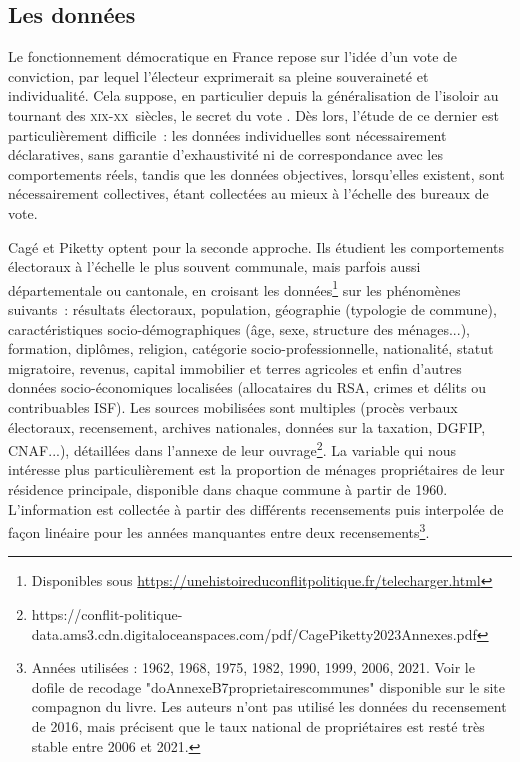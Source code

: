 \documentclass[a4paper,14pt]{article}
\begin{document}
\begin{multicols}{2}
\section*{Les données}
Le fonctionnement démocratique en France repose sur l'idée d'un vote de conviction, par lequel l'électeur exprimerait sa pleine souveraineté et individualité. Cela suppose, en particulier depuis la généralisation de l'isoloir au tournant des \textsc{xix}\ieme-\textsc{xx}\ieme ~siècles, le secret du vote \parencite{garrigou_les_1988}. Dès lors, l'étude de ce dernier est particulièrement difficile~: les données individuelles sont nécessairement déclaratives, sans garantie d'exhaustivité ni de correspondance avec les comportements réels, tandis que les données objectives, lorsqu'elles existent, sont nécessairement collectives, étant collectées au mieux à l'échelle des bureaux de vote.


Cagé et Piketty optent pour la seconde approche. Ils étudient les comportements électoraux à l'échelle le plus souvent communale, mais parfois aussi départementale ou cantonale, en croisant les données\footnote{Disponibles sous \url{https://unehistoireduconflitpolitique.fr/telecharger.html}} sur les phénomènes suivants~: résultats électoraux, population, géographie (typologie de commune), caractéristiques socio-démographiques (âge,  sexe, structure des ménages...), formation, diplômes, religion, catégorie socio-professionnelle, nationalité, statut migratoire, revenus, capital immobilier et terres agricoles et enfin d'autres données socio-économiques localisées (allocataires du RSA, crimes et délits ou contribuables ISF). Les sources mobilisées sont multiples (procès verbaux électoraux, recensement, archives nationales, données sur la taxation, DGFIP, CNAF...), détaillées dans l'annexe de leur ouvrage\footnote{https://conflit-politique-data.ams3.cdn.digitaloceanspaces.com/pdf/CagePiketty2023Annexes.pdf}. La variable qui nous intéresse plus particulièrement est la proportion de ménages propriétaires de leur résidence principale, disponible dans chaque commune à partir de 1960. L'information est collectée à partir des différents recensements puis interpolée de façon linéaire pour les années manquantes entre deux recensements\footnote{Années utilisées : 1962, 1968, 1975, 1982, 1990, 1999, 2006, 2021. Voir le dofile de recodage "doAnnexeB7proprietairescommunes" disponible sur le site compagnon du livre. Les auteurs n'ont pas utilisé les données du recensement de 2016, mais précisent que le taux national de propriétaires est resté très stable entre 2006 et 2021.}.



\end{multicols}
\end{document}
